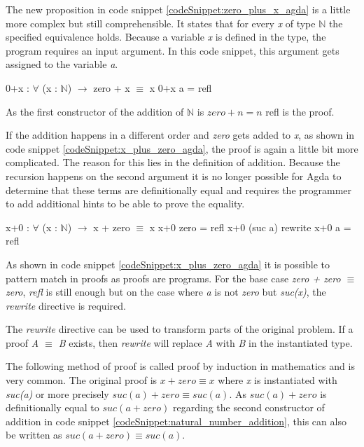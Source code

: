 The new proposition in code snippet \ref{codeSnippet:zero_plus_x_agda} is a little more complex but still comprehensible. 
It states that for every \emph{x} of type $\mathbb{N}$ the specified equivalence holds. 
Because a variable \emph{x} is defined in the type, the program requires an input argument.
In this code snippet, this argument gets assigned to the variable \emph{a}.

\begin{codesnippet}[mathescape=true, caption={Proof of addition to zero in Agda}, label={codeSnippet:zero_plus_x_agda}]
0+x : $\forall$ (x : $\mathbb{N}$) $\rightarrow$ zero + x $\equiv$ x
0+x a = refl
\end{codesnippet}

As the first constructor of the addition of $\mathbb{N}$ is $zero + n = n$ refl is the proof.

If the addition happens in a different order and \emph{zero} gets added to \emph{x}, as shown in code snippet \ref{codeSnippet:x_plus_zero_agda}, the proof is again a little bit more complicated. 
The reason for this lies in the definition of addition.
Because the recursion happens on the second argument it is no longer possible for Agda to determine that these terms are definitionally equal and requires the programmer to add additional hints to be able to prove the equality.

\begin{codesnippet}[mathescape=true, caption={Proof of addition of zero in Agda}, label={codeSnippet:x_plus_zero_agda}]
x+0 : $\forall$ (x : $\mathbb{N}$) $\rightarrow$ x + zero $\equiv$ x
x+0 zero = refl
x+0 (suc a) rewrite x+0 a = refl
\end{codesnippet}

As shown in code snippet \ref{codeSnippet:x_plus_zero_agda} it is possible to pattern match in proofs as proofs are programs.
For the base case \emph{zero + zero $\equiv$ zero}, \emph{refl} is still enough but on the case where \emph{a} is not \emph{zero} but \emph{suc(x)}, the \emph{rewrite} directive is required.

The \emph{rewrite} directive can be used to transform parts of the original problem. If a proof \emph{A $\equiv$ B} exists, then \emph{rewrite} will replace \emph{A} with \emph{B} in the instantiated type.

The following method of proof is called proof by induction in mathematics and is very common.
The original proof is $x + zero \equiv x$ where \emph{x} is instantiated with \emph{suc(a)} or more precisely $suc(a) + zero \equiv suc(a)$.
As $suc(a) + zero$ is definitionally equal to $suc(a + zero)$ regarding the second constructor of addition in code snippet \ref{codeSnippet:natural_number_addition}, this can also be written as $suc(a + zero) \equiv suc(a)$.


